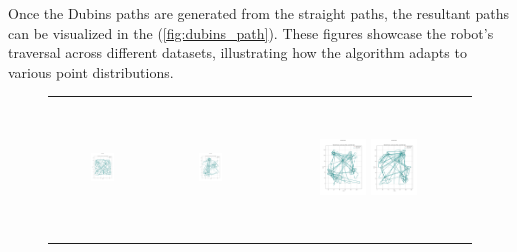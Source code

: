 Once the Dubins paths are generated from the straight paths, the resultant paths can be visualized in the (\autoref{fig:dubins_path}). These figures showcase the robot's traversal across different datasets, illustrating how the algorithm adapts to various point distributions.
\begin{figure}[p]
    \centering
    \begin{tabular}{ccc}
         \includegraphics[height=36mm,width=0.24\textwidth]{Images/simulation_no_obs/dubins_path/01.png}
        & \includegraphics[height=36mm,width=0.24\textwidth]{Images/simulation_no_obs/dubins_path/02.png}
        & \includegraphics[height=36mm,width=0.24\textwidth]{Images/simulation_no_obs/dubins_path/03.png}
         \includegraphics[height=36mm,width=0.24\textwidth]{Images/simulation_no_obs/dubins_path/04.png}\\[-4pt]


\end{tabular}
\end{figure}
